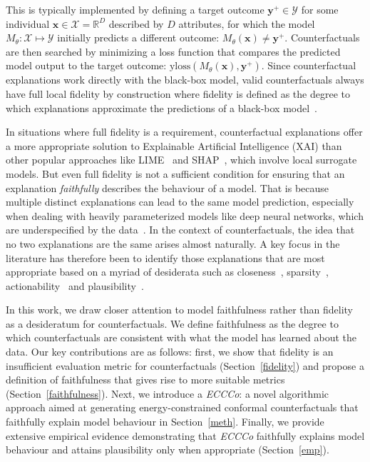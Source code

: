 This is typically implemented by defining a target outcome $\mathbf{y}^+ \in \mathcal{Y}$ for some individual $\mathbf{x} \in \mathcal{X}=\mathbb{R}^D$ described by $D$ attributes, for which the model $M_{\theta}:\mathcal{X}\mapsto\mathcal{Y}$ initially predicts a different outcome: $M_{\theta}(\mathbf{x})\ne \mathbf{y}^+$. Counterfactuals are then searched by minimizing a loss function that compares the predicted model output to the target outcome: $\text{yloss}(M_{\theta}(\mathbf{x}),\mathbf{y}^+)$. Since counterfactual explanations work directly with the black-box model, valid counterfactuals always have full local fidelity by construction where fidelity is defined as the degree to which explanations approximate the predictions of a black-box model~\citep{molnar2022interpretable}. 

In situations where full fidelity is a requirement, counterfactual explanations offer a more appropriate solution to Explainable Artificial Intelligence (XAI) than other popular approaches like LIME~\citep{ribeiro2016why} and SHAP~\citep{lundberg2017unified}, which involve local surrogate models. But even full fidelity is not a sufficient condition for ensuring that an explanation \textit{faithfully} describes the behaviour of a model. That is because multiple distinct explanations can lead to the same model prediction, especially when dealing with heavily parameterized models like deep neural networks, which are underspecified by the data~\citep{wilson2020case}. In the context of counterfactuals, the idea that no two explanations are the same arises almost naturally. A key focus in the literature has therefore been to identify those explanations that are most appropriate based on a myriad of desiderata such as closeness~\citep{wachter2017counterfactual}, sparsity~\citep{schut2021generating}, actionability~\citep{ustun2019actionable} and plausibility~\citep{joshi2019realistic}. 

In this work, we draw closer attention to model faithfulness rather than fidelity as a desideratum for counterfactuals. We define faithfulness as the degree to which counterfactuals are consistent with what the model has learned about the data. Our key contributions are as follows: first, we show that fidelity is an insufficient evaluation metric for counterfactuals (Section~\ref{fidelity}) and propose a definition of faithfulness that gives rise to more suitable metrics (Section~\ref{faithfulness}). Next, we introduce a \textit{ECCCo}: a novel algorithmic approach aimed at generating energy-constrained conformal counterfactuals that faithfully explain model behaviour in Section~\ref{meth}. Finally, we provide extensive empirical evidence demonstrating that \textit{ECCCo} faithfully explains model behaviour and attains plausibility only when appropriate (Section~\ref{emp}).

